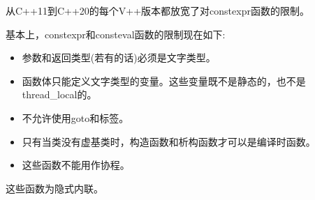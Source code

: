 从C++11到C++20的每个V++版本都放宽了对constexpr函数的限制。

基本上，constexpr和consteval函数的限制现在如下:

\begin{itemize}
\item
参数和返回类型(若有的话)必须是文字类型。

\item
函数体只能定义文字类型的变量。这些变量既不是静态的，也不是thread\_local的。

\item
不允许使用goto和标签。

\item
只有当类没有虚基类时，构造函数和析构函数才可以是编译时函数。

\item
这些函数不能用作协程。
\end{itemize}

这些函数为隐式内联。